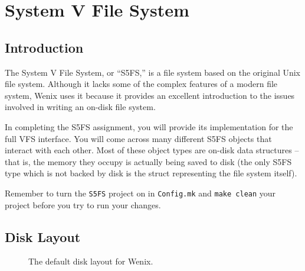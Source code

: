 \chapter{System V File System}
\label{s5fs}

\section{Introduction}

The System V File System, or ``S5FS,'' is a file system based on the original Unix file system.  Although it lacks some of the complex features of a modern file system, Wenix uses it because it provides an excellent introduction to the issues involved in writing an on-disk file system.

In completing the S5FS assignment, you will provide its implementation for the full VFS interface.  You will come across many different S5FS objects that interact with each other.  Most of these object types are on-disk data structures -- that is, the memory they occupy is actually being saved to disk (the only S5FS type which is not backed by disk is the struct representing the file system itself).

Remember to turn the \texttt{S5FS} project on in \texttt{Config.mk} and \texttt{make clean} your project before you try to run your changes.
\section{Disk Layout}

\begin{figure}
    \centering
    \caption{The default disk layout for Wenix.}
\end{figure}

